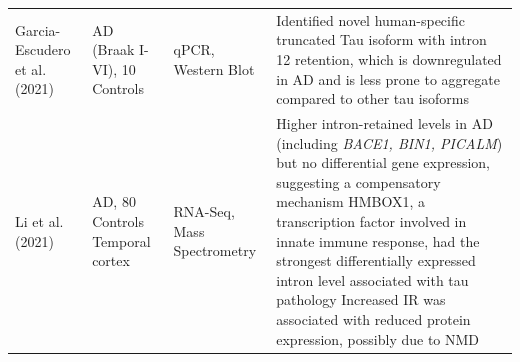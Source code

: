 \begin{changemargin}{1.5cm}
\begin{landscape}
\begin{longtable}[c]{p{3cm}p{4cm}p{3cm}p{16cm}}
			\centering Garcia-Escudero et al. (2021) \cite{Garcia-Escudero2021} &
			\centering 32 AD (Braak I-VI), 10 Controls &
			\centering qPCR, Western Blot &
			\tabitem Identified novel human-specific truncated Tau isoform with intron 12 retention, which is downregulated in AD and is less prone to aggregate compared to other tau isoforms \\
			\hdashline[0.5pt/5pt]
			
			\centering Li et al. (2021) \cite{Li2021} &
			\centering 84 AD, 80 Controls \newline Temporal cortex &
			\centering RNA-Seq, Mass Spectrometry &
			\tabitem Higher intron-retained levels in AD (including \textit{BACE1, BIN1, PICALM}) but no differential gene expression, suggesting a compensatory mechanism \newline
			\tabitem HMBOX1, a transcription factor involved in innate immune response, had the strongest  differentially expressed intron level associated with tau pathology \newline
			\tabitem Increased IR was associated with reduced protein expression, possibly due to NMD \\* \bottomrule
		\end{longtable}
	\end{landscape}
\end{changemargin}


